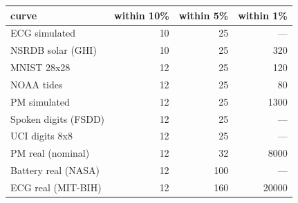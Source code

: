 \begin{tabular}{lrrr}
\toprule
curve & within 10\% & within 5\% & within 1\% \\
\midrule
ECG simulated & 10 & 25 & --- \\
NSRDB solar (GHI) & 10 & 25 & 320 \\
MNIST 28x28 & 12 & 25 & 120 \\
NOAA tides & 12 & 25 & 80 \\
PM simulated & 12 & 25 & 1300 \\
Spoken digits (FSDD) & 12 & 25 & --- \\
UCI digits 8x8 & 12 & 25 & --- \\
PM real (nominal) & 12 & 32 & 8000 \\
Battery real (NASA) & 12 & 100 & --- \\
ECG real (MIT-BIH) & 12 & 160 & 20000 \\
\bottomrule
\end{tabular}
